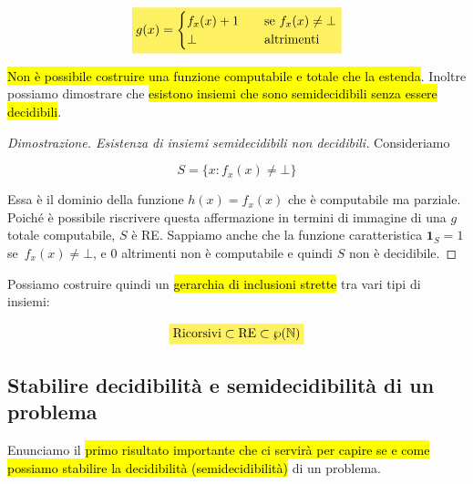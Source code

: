 \documentclass[a4paper,11pt,twoside]{article}
\theoremstyle{plain}
\theoremstyle{definition}
\theoremstyle{remark}
\newcommand{\mhl}[1]{\colorbox{hlcolor}{$\displaystyle #1$}}
\begin{document}
\begin{equation}
  \mhl{
    g(x) =
    \begin{cases}
      f_x(x) + 1 & \quad \text{se } f_x(x) \neq \bot \\
      \bot       & \quad \text{altrimenti}
    \end{cases}
  }
\end{equation}

\hl{Non è possibile costruire una funzione computabile e totale che la estenda}.
Inoltre possiamo dimostrare che \hl{esistono insiemi che sono semidecidibili
senza essere decidibili}.

\begin{proof}[Dimostrazione. Esistenza di insiemi semidecidibili non decidibili]
  Consideriamo

  \[
    S = \{ x : f_x(x) \neq \bot \}
  \]

  Essa è il dominio della funzione $h(x) = f_x(x)$ che è computabile ma
  parziale. Poiché è possibile riscrivere questa affermazione in termini di
  immagine di una $g$ totale computabile, $S$ è RE\@. Sappiamo anche che la
  funzione caratteristica $\mathbf{1}_S = 1$ se $f_x(x) \neq \bot$, e 0
  altrimenti non è computabile e quindi $S$ non è decidibile.
\end{proof}

Possiamo costruire quindi un \hl{gerarchia di inclusioni strette} tra vari tipi di
insiemi:

\begin{equation}
  \mhl{
    \text{Ricorsivi} \subset \text{RE} \subset \wp(\mathbb{N})
  }
\end{equation}

\subsection{Stabilire decidibilità e semidecidibilità di un problema}\label{sec:stabilire-dec-sec-}

Enunciamo il \hl{primo risultato importante che ci servirà per capire se e come
possiamo stabilire la decidibilità (semidecidibilità)} di un problema.
\end{document}
